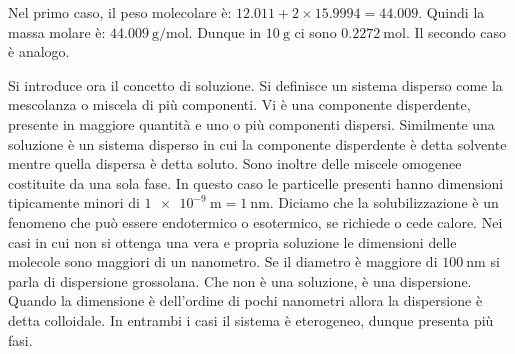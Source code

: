 \documentclass[../AppuntiChimica]{subfiles}
\begin{document}
	Nel primo caso, il peso molecolare è: $ 12.011+2\times15.9994=44.009 $. Quindi la massa molare è: $ \SI{44.009}{\gram\per\mole} $. Dunque in $ \SI{10}{\gram} $ ci sono $ \SI{0.2272}{\mole} $. Il secondo caso è analogo.
	
	Si introduce ora il concetto di soluzione. Si definisce un sistema disperso come la mescolanza o miscela di più componenti. Vi è una componente disperdente, presente in maggiore quantità e uno o più componenti dispersi. Similmente una soluzione è un sistema disperso in cui la componente disperdente è detta solvente mentre quella dispersa è detta soluto. Sono inoltre delle miscele omogenee costituite da una sola fase. In questo caso le particelle presenti hanno dimensioni tipicamente minori di $ \SI{1e-9}{\meter}=\SI{1}{\nano\meter} $. Diciamo che la solubilizzazione è un fenomeno che può essere endotermico o esotermico, se richiede o cede calore. Nei casi in cui non si ottenga una vera e propria soluzione le dimensioni delle molecole sono maggiori di un nanometro. Se il diametro è maggiore di $ \SI{100}{\nano\meter} $ si parla di dispersione grossolana. Che non è una soluzione, è una dispersione. Quando la dimensione è dell'ordine di pochi nanometri allora la dispersione è detta colloidale. In entrambi i casi il sistema è eterogeneo, dunque presenta più fasi. 	
\end{document}
